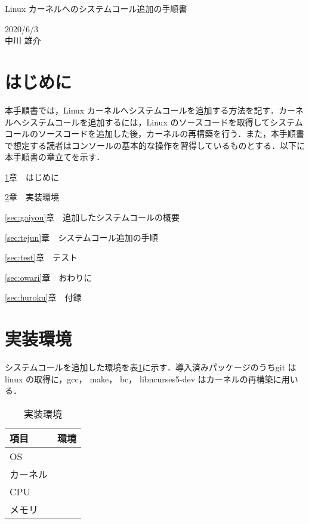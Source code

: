 \documentclass[12pt]{jsarticle}
\begin{document}
\begin{center}
{\LARGE Linux カーネルへのシステムコール追加の手順書}
\end{center}

\begin{flushright}
  2020/6/3\\
  中川 雄介
\end{flushright}
\section{はじめに}\label{sec:hajime}
\label{sec:introduction}
本手順書では，Linux カーネルへシステムコールを追加する方法を記す．カーネルへシステムコールを追加するには，Linux のソースコードを取得してシステムコールのソースコードを追加した後，カーネルの再構築を行う．また，本手順書で想定する読者はコンソールの基本的な操作を習得しているものとする．以下に本手順書の章立てを示す．

\ref{sec:hajime}章　はじめに

\ref{sec:env}章　実装環境

\ref{sec:gaiyou}章　追加したシステムコールの概要

\ref{sec:tejun}章　システムコール追加の手順

\ref{sec:test}章　テスト

\ref{sec:owari}章　おわりに

\ref{sec:huroku}章　付録

\section{実装環境}\label{sec:env}

システムコールを追加した環境を表\ref{tab:1}に示す．導入済みパッケージのうちgit はlinux の取得に，gcc， make， bc， libncurses5-dev はカーネルの再構築に用いる．
\begin{table}[h]
  \begin{center}
    \caption{実装環境}\label{tab:1}
    \begin{tabular}{l|l}
      \hline\hline
      \multicolumn{1}{l|}{項目} & \multicolumn{1}{l}{環境}\\
      \hline
      OS &  \\
      カーネル & \\
      CPU & \\
      メモリ & \\
      \hline
    \end{tabular}
  \end{center}
\end{table}
\end{document}
